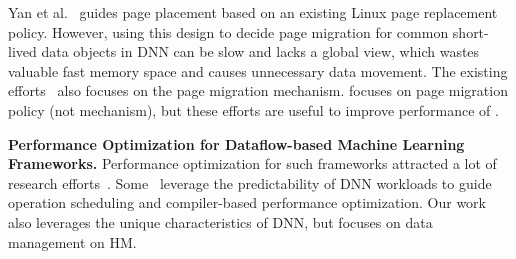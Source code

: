 Yan et al.~\cite{Yan:ASPLOS19} guides page placement based on an existing Linux page replacement policy. However, using this design to decide page migration for common short-lived data objects in DNN can be slow and lacks a global view, which wastes valuable fast memory space and causes unnecessary data movement. The existing efforts~\cite{Yan:ASPLOS19, 7446088, Seshadri:2013:RFE:2540708.2540725} also focuses on the page migration mechanism. \name focuses on page migration policy (not mechanism), but these efforts are useful to improve performance of \name.

\textbf{Performance Optimization for Dataflow-based Machine Learning Frameworks.} Performance optimization for such frameworks attracted a lot of research efforts~\cite{222575,pmlr-v80-gao18a,222629,liu:micro18,ipdps19_liu,234946,google:device_placement,google:device_placement_re,222605,DBLP:conf/asplos/SivathanuCSZ19,DBLP:journals/corr/abs-1802-04730,Wang:2018:SDG:3178487.3178491,222611}.  Some~\cite{7472805,Jin:2018:LMR:3274266.3243904,liu:micro18, ipdps19_liu, DBLP:conf/asplos/SivathanuCSZ19,222611} leverage the predictability of DNN workloads to guide operation scheduling and compiler-based performance optimization. Our work also leverages the unique characteristics of DNN, but focuses on data management on HM. 


